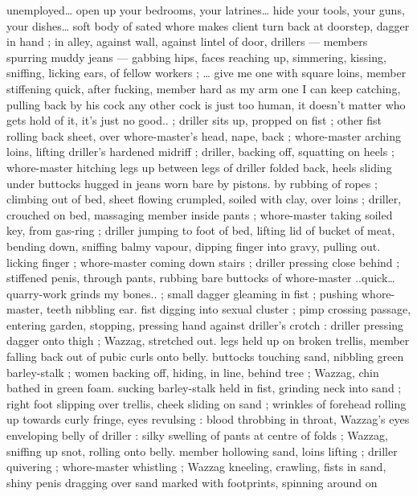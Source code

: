 unemployed{\ldots} open up your bedrooms, your latrines{\ldots} hide your 
tools, your guns, your dishes{\ldots} soft body of sated whore makes 
client turn back at doorstep, dagger in hand{\td} {\gr} ; in alley, against wall, 
against lintel of door, drillers --- members spurring muddy jeans --- 
gabbing hips, faces reaching up, simmering, kissing, sniffing, licking 
ears, of fellow workers ; {\ldots} {\gl}{\td} give me one with square loins, member 
stiffening quick, after fucking, member hard as my arm{\td} one I can 
keep catching, pulling back by his cock{\td} any other cock is just too 
human, it doesn't matter who gets hold of it, it's just no good..{\gr} ; 
driller sits up, propped on fist ; other fist rolling back sheet, over 
whore-master's head, nape, back ; whore-master arching loins, lifting 
driller's hardened midriff ; driller, backing off, squatting on heels ; 
whore-master hitching legs up between legs of driller folded back, 
heels sliding under buttocks hugged in jeans worn bare by pistons. 
by rubbing of ropes ; climbing out of bed, sheet flowing crumpled, 
soiled with clay, over loins ; driller, crouched on bed, massaging 
member inside pants ; whore-master taking soiled key, from gas-ring 
; driller jumping to foot of bed, lifting lid of bucket of meat, bending 
down, sniffing balmy vapour, dipping finger into gravy, pulling out. 
licking finger ; whore-master coming down stairs ; driller pressing 
close behind ; stiffened penis, through pants, rubbing bare buttocks 
of whore-master{\td} {\gl}..quick{\ldots} quarry-work grinds my bones..{\gr} ; small 
dagger gleaming in fist ; pushing whore-master, teeth nibbling ear. 
fist digging into sexual cluster ; pimp crossing passage, entering 
garden, stopping, pressing hand against driller's crotch : driller 
pressing dagger onto thigh ; Wazzag, stretched out. legs held up on 
broken trellis, member falling back out of pubic curls onto belly. 
buttocks touching sand, nibbling green barley-stalk ; women backing 
off, hiding, in line, behind tree ; Wazzag, chin bathed in green foam. 
sucking barley-stalk held in fist, grinding neck into sand ; right foot 
slipping over trellis, cheek sliding on sand ; wrinkles of forehead 
rolling up towards curly fringe, eyes revulsing : blood throbbing in 
throat, Wazzag's eyes enveloping belly of driller : silky swelling of 
pants at centre of folds ; Wazzag, sniffing up snot, rolling onto belly. 
member hollowing sand, loins lifting ; driller quivering ; whore-master 
whistling ; Wazzag kneeling, crawling, fists in sand, shiny penis 
dragging over sand marked with footprints, spinning around on 
